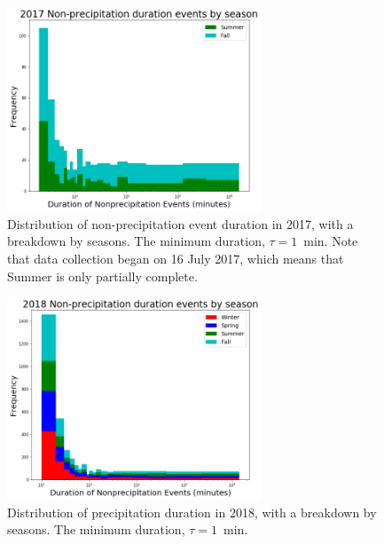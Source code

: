 \documentclass[11pt]{report}
\begin{document}
\clearpage

\begin{figure}[t]
	\centering
	\includegraphics[width=0.675\textwidth]{Figures/nonprecip_2017.png}
	\caption[Histogram of non-precipitation events for 2017 broken down
          by season]{\label{np2017} Distribution of non-precipitation event
          duration in 2017, with a breakdown by seasons. The minimum
          duration, $\tau = 1$~min. Note that data collection began on 16
          July 2017, which means that Summer is only partially complete.}
\end{figure}
\begin{figure}[b]
	\centering
	\includegraphics[width=0.675\textwidth]{Figures/nonprecip_2018.png}
	\caption[Histogram of non-precipitation events for 2018 broken down by season]{\label{np2018}
		Distribution of precipitation duration in 2018, with a breakdown
		by seasons. The minimum duration, $\tau=1$~min. }
\end{figure}
\end{document}
